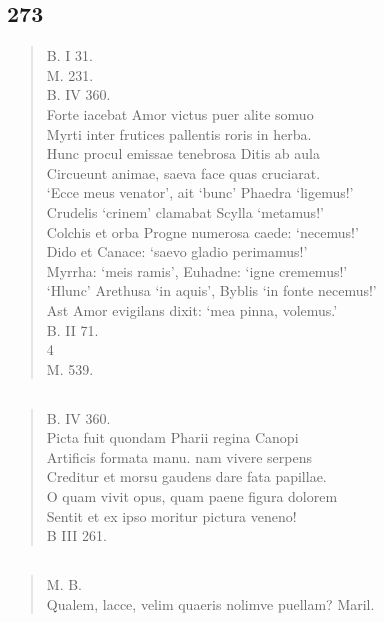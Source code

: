 \documentclass[11pt, a4paper]{report}
\begin{document}
            \subsection*{273}
      \begin{verse}
      B. I 31. \\ M. 231. \\ B. IV 360. \\ Forte iacebat Amor victus puer alite somuo \\ Myrti inter frutices pallentis roris in herba. \\ Hunc procul emissae tenebrosa Ditis ab aula \\ Circueunt animae, saeva face quas cruciarat. \\ ‘Ecce meus venator’, ait ‘bunc’ Phaedra ‘ligemus!’ \\ Crudelis ‘crinem’ clamabat Scylla ‘metamus!’ \\ Colchis et orba Progne numerosa caede: ‘necemus!’ \\ Dido et Canace: ‘saevo gladio perimamus!’ \\ Myrrha: ‘meis ramis’, Euhadne: ‘igne crememus!’ \\ ‘Hlunc’ Arethusa ‘in aquis’, Byblis ‘in fonte necemus!’ \\ Ast Amor evigilans dixit: ‘mea pinna, volemus.’ \\ B. II 71. \\ 4 \\ M. 539. \\ 
      \end{verse}
  
            \subsection*{}
      \begin{verse}
      B. IV 360. \\ Picta fuit quondam Pharii regina Canopi \\ Artificis formata manu. nam vivere serpens \\ Creditur et morsu gaudens dare fata papillae. \\ O quam vivit opus, quam paene figura dolorem \\ Sentit et ex ipso moritur pictura veneno! \\ B III 261. \\ 
      \end{verse}
  
            \subsection*{}
      \begin{verse}
      M. B. \\ Qualem, lacce, velim quaeris nolimve puellam? Maril. \\ 
      \end{verse}
  
\end{document}
